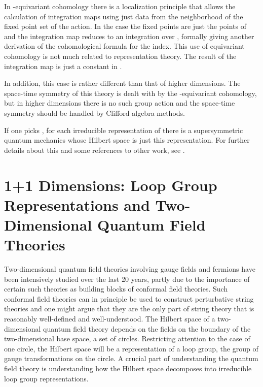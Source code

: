 \documentclass[a4paper,a4paper]{article}
\theoremstyle{conjecture}
\begin{document}
In \coordHE{}-equivariant cohomology there is a localization principle that allows the calculation
of integration maps using just data from the neighborhood of the fixed point set of the \coordHE{} action.
In the \coordHE{} case the fixed points are just the points of \coordHE{} and the integration map reduces to
an integration over \coordHE{}, formally giving another derivation of the cohomological formula for the index.
This use of equivariant cohomology is not much related to representation theory.  The result of 
the integration map is just a constant in \coordHE{}. 

In addition, this case is rather different than that of higher dimensions.  The space-time
symmetry of this theory is dealt with by the \coordHE{}-equivariant cohomology, but in higher dimensions
there is no such group action and the space-time symmetry should be handled by Clifford algebra methods.

If one picks \coordHE{}, for each irreducible representation of \coordHE{} there is a supersymmetric quantum
mechanics whose Hilbert space is just this representation. For further details about this and some
references to other work, see \cite{Woit2}.

\section{1+1 Dimensions: Loop Group Representations and Two-Dimensional Quantum Field Theories}

Two-dimensional quantum field theories involving gauge fields and fermions
 have been intensively studied over the last 20 years, partly due
to the importance of certain such theories as building blocks of conformal field theories.  Such
conformal field theories can in principle be used to construct perturbative string theories and one
might argue that they are the only part of string theory that is reasonably well-defined and
well-understood.  The Hilbert space of a two-dimensional quantum field theory depends on the
fields on the boundary of the two-dimensional base space, a set of circles.  Restricting
attention to the case of one circle, the Hilbert space will be a representation of a loop group, the
group of gauge transformations on the circle.  A crucial part of understanding the quantum field
theory is understanding how the Hilbert space decomposes into irreducible loop group representations.
\end{document}
